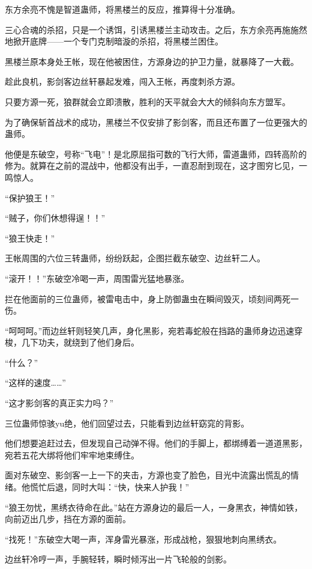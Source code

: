
\begin{this_body}

东方余亮不愧是智道蛊师，将黑楼兰的反应，推算得十分准确。

三心合魂的杀招，只是一个诱饵，引诱黑楼兰主动攻击。之后，东方余亮再施施然地掀开底牌——一个专门克制暗漩的杀招，将黑楼兰困住。

黑楼兰原本身处王帐，现在他被困住，方源身边的护卫力量，就暴降了一大截。

趁此良机，影剑客边丝轩暴起发难，闯入王帐，再度刺杀方源。

只要方源一死，狼群就会立即溃散，胜利的天平就会大大的倾斜向东方盟军。

为了确保斩首战术的成功，黑楼兰不仅安排了影剑客，而且还布置了一位更强大的蛊师。

他便是东破空，号称“飞电”！是北原屈指可数的飞行大师，雷道蛊师，四转高阶的修为。就算在之前的混战中，他都没有出手，一直忍耐到现在，这才图穷匕见，一鸣惊人。

“保护狼王！”

“贼子，你们休想得逞！！”

“狼王快走！”

王帐周围的六位三转蛊师，纷纷跃起，企图拦截东破空、边丝轩二人。

“滚开！！”东破空冷喝一声，周围雷光猛地暴涨。

拦在他面前的三位蛊师，被雷电击中，身上防御蛊虫在瞬间毁灭，顷刻间两死一伤。

“呵呵呵。”而边丝轩则轻笑几声，身化黑影，宛若毒蛇般在挡路的蛊师身边迅速穿梭，几下功夫，就绕到了他们身后。

“什么？”

“这样的速度……”

“这才影剑客的真正实力吗？”

三位蛊师惊骇yu绝，他们回望过去，只能看到边丝轩窈窕的背影。

他们想要追赶过去，但发现自己动弹不得。他们的手脚上，都绑缚着一道道黑影，宛若五花大绑将他们牢牢地束缚住。

面对东破空、影剑客一上一下的夹击，方源也变了脸色，目光中流露出慌乱的情绪。他慌忙后退，同时大叫：“快，快来人护我！”

“狼王勿忧，黑绣衣待命在此。”站在方源身边的最后一人，一身黑衣，神情如铁，向前迈出几步，挡在方源的面前。

“找死！”东破空大喝一声，浑身雷光暴涨，形成战枪，狠狠地刺向黑绣衣。

边丝轩冷哼一声，手腕轻转，瞬时倾泻出一片飞轮般的剑影。


\end{this_body}
